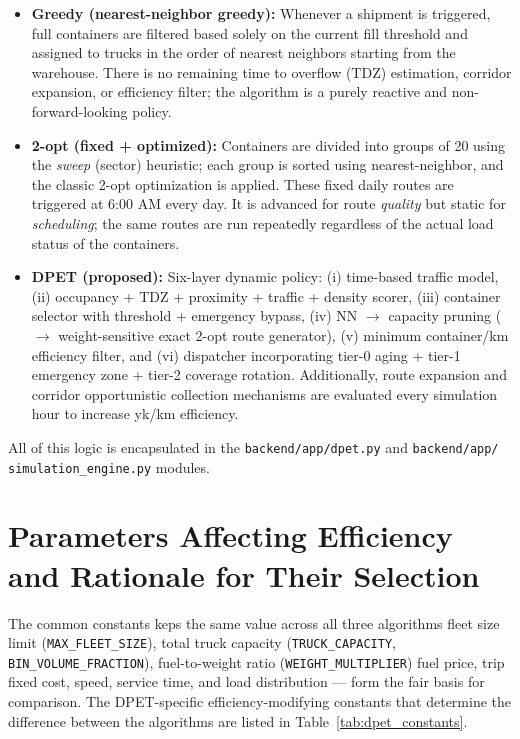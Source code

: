 \documentclass[12pt,a4paper]{report}
\begin{document}
\begin{itemize}[leftmargin=*]
  \item \textbf{Greedy (nearest-neighbor greedy):} Whenever a shipment is triggered, full containers are filtered based solely on the current fill threshold and assigned to trucks in the order of nearest neighbors starting from the warehouse. There is no remaining time to overflow (TDZ) estimation, corridor expansion, or efficiency filter; the algorithm is a purely reactive and non-forward-looking policy.
  \clearpage

  \item \textbf{2-opt (fixed + optimized):} Containers are divided into groups of 20 using the \textit{sweep} (sector) heuristic; each group is sorted using nearest-neighbor, and the classic 2-opt optimization is applied. These fixed daily routes are triggered at 6:00 AM every day. It is advanced for route \textit{quality} but static for \textit{scheduling}; the same routes are run repeatedly regardless of the actual load status of the containers.


    \item \textbf{DPET (proposed):} Six-layer dynamic policy: (i) time-based traffic model, (ii) occupancy + TDZ + proximity + traffic + density scorer, (iii) container selector with threshold + emergency bypass, (iv) NN $\rightarrow$ capacity pruning ($\rightarrow$ weight-sensitive exact 2-opt route generator), (v) minimum container/km efficiency filter, and (vi) dispatcher incorporating tier-0 aging + tier-1 emergency zone + tier-2 coverage rotation. Additionally, route expansion and corridor opportunistic collection mechanisms are evaluated every simulation hour to increase yk/km efficiency.
\end{itemize}

All of this logic is encapsulated in the \texttt{backend/app/dpet.py}  and \texttt{backend/app/ \\simulation\_engine.py} modules.

\section{Parameters Affecting Efficiency and Rationale for Their Selection}
\label{sec:parameters}

\indent The common constants keps the same value across all three algorithms fleet size limit (\texttt{MAX\_FLEET\_SIZE}), total truck capacity (\texttt{TRUCK\_CAPACITY}, \texttt{BIN\_VOLUME\_FRACTION}), fuel-to-weight ratio (\texttt{WEIGHT\_MULTIPLIER})  fuel price, trip fixed cost, speed, service time, and load distribution --- form the fair basis for comparison. The DPET-specific efficiency-modifying constants that determine the difference between the algorithms are listed in Table~\ref{tab:dpet_constants}.
\end{document}

